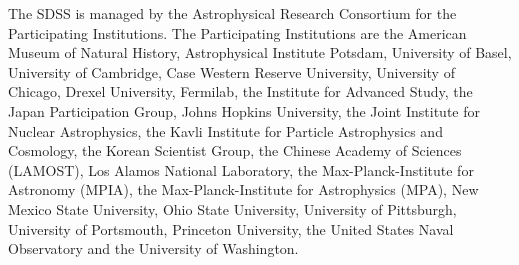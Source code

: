 \documentclass[usenatbib]{mn2e}
\begin{document}
The SDSS is managed by the Astrophysical Research Consortium for the Participating Institutions. The Participating Institutions are the American Museum of Natural History, Astrophysical  Institute Potsdam, University of Basel, University of Cambridge, 
Case Western Reserve University, University of Chicago, Drexel University, Fermilab, the Institute for Advanced Study, the Japan 
Participation Group, Johns Hopkins University, the Joint Institute for Nuclear Astrophysics, the Kavli Institute for Particle Astrophysics and Cosmology, the Korean Scientist Group, the Chinese Academy of Sciences (LAMOST), Los Alamos National Laboratory, the Max-Planck-Institute for Astronomy (MPIA), the Max-Planck-Institute for Astrophysics (MPA), New Mexico State University, Ohio State University, University of Pittsburgh, University of Portsmouth, Princeton University, the United States Naval Observatory and the University of Washington. 

{}

\end{document}
